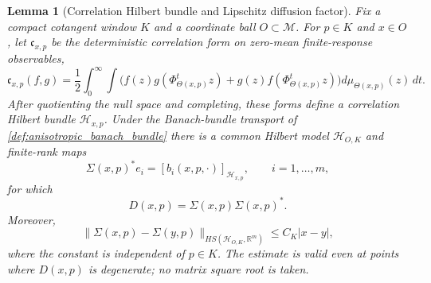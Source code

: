 \documentclass[12pt, letterpaper]{amsart}
\newcommand{\Mcal}{\mathcal{M}}
\newcommand{\R}{\mathbb{R}}
\theoremstyle{plain}
\newtheorem{lemma}[theorem]{Lemma}
\theoremstyle{definition}
\theoremstyle{remark}
\begin{document}
\begin{lemma}[Correlation Hilbert bundle and Lipschitz diffusion factor]
\label{lem:correlation_hilbert_lipschitz_factor}
Fix a compact cotangent window $K$ and a coordinate ball $O\subset\Mcal$.  For
$p\in K$ and $x\in O$, let $\mathfrak c_{x,p}$ be the deterministic correlation
form on zero-mean finite-response observables,
\begin{equation}
    \mathfrak c_{x,p}(f,g)
    =\frac12\int_0^\infty\!\int
       \big(f(z)g(\Phi_{\Theta(x,p)}^t z)
          +g(z)f(\Phi_{\Theta(x,p)}^t z)\big)
        d\mu_{\Theta(x,p)}(z)\,dt .
\end{equation}
After quotienting the null space and completing, these forms define a
correlation Hilbert bundle $\mathscr H_{x,p}$.  Under the Banach-bundle
transport of \cref{def:anisotropic_banach_bundle} there is a common Hilbert
model $\mathscr H_{O,K}$ and finite-rank maps
\begin{equation}
    \Sigma(x,p)^*e_i=[b_i(x,p,\cdot)]_{\mathscr H_{x,p}},
    \qquad i=1,\ldots,m,
\end{equation}
for which
\begin{equation}
    D(x,p)=\Sigma(x,p)\Sigma(x,p)^* .
\end{equation}
Moreover,
\begin{equation}
\label{eq:hilbert_factor_lipschitz_full}
    \|\Sigma(x,p)-\Sigma(y,p)\|_{HS(\mathscr H_{O,K},\R^m)}
    \le C_K |x-y|,
\end{equation}
where the constant is independent of $p\in K$.  The estimate is valid even at
points where $D(x,p)$ is degenerate; no matrix square root is taken.
\end{lemma}
\end{document}
